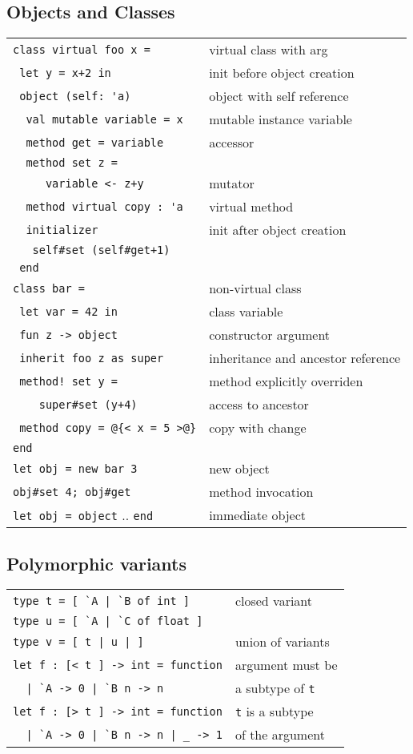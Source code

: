\documentclass[10pt,landscape]{article}
\begin{document}
\begin{multicols}{3}
\subsection{Objects and Classes}

\begin{tabular}{ll}
\Verb!class virtual foo x = !& virtual class with arg \\
\Verb! let y = x+2 in! & init before object creation\\
\Verb! object (self: 'a)! & object with self reference\\
\Verb!  val mutable variable = x! & mutable instance variable \\
\Verb!  method get = variable! & accessor \\
\Verb!  method set z =!\\
\Verb!     variable <- z+y! & mutator\\
\Verb!  method virtual copy : 'a! & virtual method\\
\Verb!  initializer! & init after object creation\\
\Verb!   self#set (self#get+1)!& \\
\Verb! end! &  \\
\Verb!class bar = !&  non-virtual class\\
\Verb! let var = 42 in! & class variable\\
\Verb! fun z -> object! & constructor argument \\
\verb& inherit foo z as super& & inheritance and ancestor reference\\
\verb& method! set y =& & method explicitly overriden\\
\Verb!    super#set (y+4)! & access to ancestor \\
\Verb! method copy = @{< x = 5 >@}! & copy with change \\
\Verb!end! & \\
\Verb!let obj = new bar 3! & new object \\
\Verb!obj#set 4; obj#get!  & method invocation \\
\Verb!let obj = object! .. \Verb!end! & immediate object \
\end{tabular}

\subsection{Polymorphic variants}


\begin{tabular}{ll}
\Verb!type t = [ `A | `B of int ]! & closed variant \\
\Verb!type u = [ `A | `C of float ]! & \\
\Verb!type v = [ t | u | ]! & union of variants \\
\Verb!let f : [< t ] -> int = function! & argument must be\\
\Verb!  | `A -> 0 | `B n -> n! & \hfill a subtype of \Verb!t!\\
\Verb!let f : [> t ] -> int = function! & \Verb!t! is a subtype \\
\Verb!  | `A -> 0 | `B n -> n | _ -> 1! & \hfill of the argument \\
\end{tabular}

\end{multicols}
\end{document}
